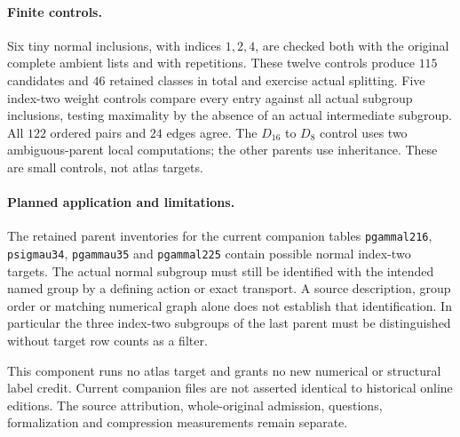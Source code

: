 \documentclass[11pt]{article}
\begin{document}
\paragraph{Finite controls.}
Six tiny normal inclusions, with indices $1,2,4$, are checked both with the
original complete ambient lists and with repetitions. These twelve controls
produce $115$ candidates and $46$ retained classes in total and exercise
actual splitting. Five index-two weight controls compare every entry against
all actual subgroup inclusions, testing maximality by the absence of an
actual intermediate subgroup. All $122$ ordered pairs and $24$ edges agree.
The $D_{16}$ to $D_8$ control uses two ambiguous-parent local computations;
the other parents use inheritance. These are small controls, not atlas targets.

\paragraph{Planned application and limitations.}
The retained parent inventories for the current companion tables
\texttt{pgammal216}, \texttt{psigmau34}, \texttt{pgammau35} and
\texttt{pgammal225} contain possible normal index-two targets. The actual
normal subgroup must still be identified with the intended named group by
a defining action or exact transport. A source description, group order or
matching numerical graph alone does not establish that identification.
In particular the three index-two subgroups of the last parent must be
distinguished without target row counts as a filter.

This component runs no atlas target and grants no new numerical or structural
label credit. Current companion files are not asserted identical to historical
online editions. The source attribution, whole-original admission, questions,
formalization and compression measurements remain separate.
\end{document}
